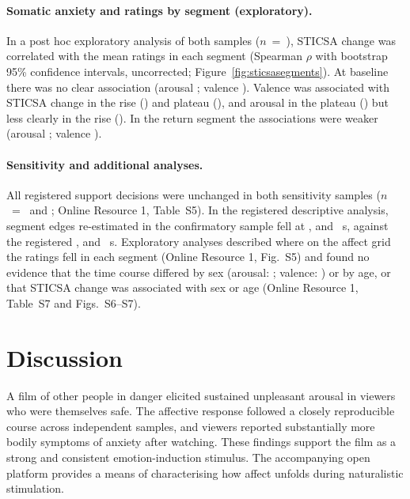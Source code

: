 \documentclass[man,12pt,british]{apa7}
\begin{document}
\paragraph{Somatic anxiety and ratings by segment (exploratory).} In a post hoc exploratory analysis of both samples
($n$~=~), STICSA change was correlated with the mean ratings in each segment (Spearman $\rho$ with
bootstrap 95\% confidence intervals, uncorrected; Figure~\ref{fig:sticsasegments}). At baseline there was no clear
association (arousal ; valence ). Valence was associated with
STICSA change in the rise () and plateau (), and arousal in the
plateau () but less clearly in the rise (). In the return segment
the associations were weaker (arousal ; valence ).

\paragraph{Sensitivity and additional analyses.} All registered support decisions were unchanged in both sensitivity
samples ($n$~=~ and ; Online Resource 1, Table~S5). In the registered
descriptive analysis, segment edges re-estimated in the confirmatory sample fell at , 
and ~s, against the registered ,  and ~s. Exploratory
analyses described where on the affect grid the ratings fell in each segment (Online Resource 1, Fig.~S5) and found
no evidence that the time course differed by sex (arousal: ; valence:
) or by age, or that STICSA change was associated with sex or age (Online
Resource 1, Table~S7 and Figs.~S6--S7).

\section{Discussion}

A film of other people in danger elicited sustained unpleasant arousal in viewers who were themselves safe. The
affective response followed a closely reproducible course across independent samples, and viewers reported
substantially more bodily symptoms of anxiety after watching. These findings support the film as a strong and
consistent emotion-induction stimulus. The accompanying open platform provides a means of characterising how affect
unfolds during naturalistic stimulation.
\end{document}
